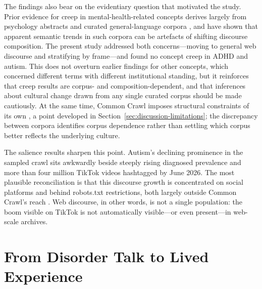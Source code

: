 The findings also bear on the evidentiary question that motivated the study. Prior evidence for creep in mental-health-related concepts derives largely from psychology abstracts and curated general-language corpora \citep{vylomovaSemanticChangesHarmrelated2021,baesSemanticShiftsMental2023,baesSemanticInflationTrauma2023}, and \citet{pislRevisitingSemanticSeverity2025} have shown that apparent semantic trends in such corpora can be artefacts of shifting discourse composition. The present study addressed both concerns---moving to general web discourse and stratifying by frame---and found no concept creep in ADHD and autism. This does not overturn earlier findings for other concepts, which concerned different terms with different institutional standing, but it reinforces that creep results are corpus- and composition-dependent, and that inferences about cultural change drawn from any single curated corpus should be made cautiously. At the same time, Common Crawl imposes structural constraints of its own \citep{baackCriticalAnalysisLargest2024}, a point developed in Section~\ref{sec:discussion-limitations}; the discrepancy between corpora identifies corpus dependence rather than settling which corpus better reflects the underlying culture.

The salience results sharpen this point. Autism's declining prominence in the sampled crawl sits awkwardly beside steeply rising diagnosed prevalence \citep{zeidanGlobalPrevalenceAutism2022,abs2024} and more than four million TikTok videos hashtagged by June 2026. The most plausible reconciliation is that this discourse growth is concentrated on social platforms and behind robots.txt restrictions, both largely outside Common Crawl's reach \citep{baackCriticalAnalysisLargest2024}. Web discourse, in other words, is not a single population: the boom visible on TikTok is not automatically visible---or even present---in web-scale archives.

\section{From Disorder Talk to Lived Experience}
\label{sec:discussion-lived-experience}

